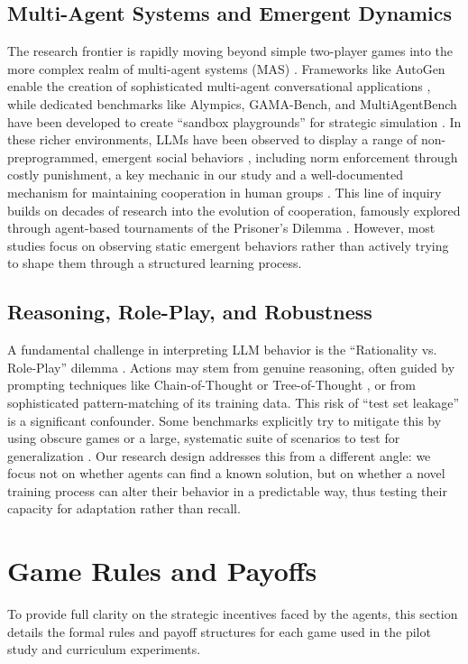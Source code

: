 \documentclass[11pt]{article}
\begin{document}
\subsection{Multi-Agent Systems and Emergent Dynamics}
The research frontier is rapidly moving beyond simple two-player games into the more complex realm of multi-agent systems (MAS) \citep{wooldridge2009introduction}. Frameworks like AutoGen enable the creation of sophisticated multi-agent conversational applications \citep{wu2023autogen}, while dedicated benchmarks like Alympics, GAMA-Bench, and MultiAgentBench have been developed to create ``sandbox playgrounds'' for strategic simulation \citep{alympics_paper, huang2025gama_bench, multiagentbench_paper}. In these richer environments, LLMs have been observed to display a range of non-preprogrammed, emergent social behaviors \citep{alympics_paper}, including norm enforcement through costly punishment, a key mechanic in our study and a well-documented mechanism for maintaining cooperation in human groups \citep{fehr2002altruistic}. This line of inquiry builds on decades of research into the evolution of cooperation, famously explored through agent-based tournaments of the Prisoner's Dilemma \citep{axelrod1981evolution}. However, most studies focus on observing static emergent behaviors rather than actively trying to shape them through a structured learning process.

\subsection{Reasoning, Role-Play, and Robustness}
A fundamental challenge in interpreting LLM behavior is the ``Rationality vs. Role-Play'' dilemma \citep{jia2025evaluation}. Actions may stem from genuine reasoning, often guided by prompting techniques like Chain-of-Thought \citep{wei2022cot,feng2023towards,lahlou2025port} or Tree-of-Thought \citep{yao2023tot}, or from sophisticated pattern-matching of its training data. This risk of ``test set leakage'' is a significant confounder. Some benchmarks explicitly try to mitigate this by using obscure games or a large, systematic suite of scenarios to test for generalization \citep{gamebench_paper, huang2025gama_bench, tmgb_paper}. Our research design addresses this from a different angle: we focus not on whether agents can find a known solution, but on whether a novel training process can alter their behavior in a predictable way, thus testing their capacity for adaptation rather than recall.

\section{Game Rules and Payoffs}
\label{app:gamerules}
To provide full clarity on the strategic incentives faced by the agents, this section details the formal rules and payoff structures for each game used in the pilot study and curriculum experiments.
\end{document}
